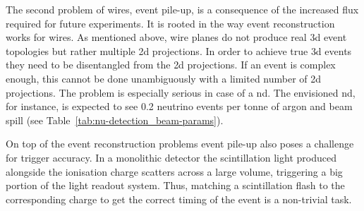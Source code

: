 The second problem of wires, event pile-up, is a consequence of the increased flux required for future experiments.
It is rooted in the way event reconstruction works for wires.
As mentioned above, wire planes do not produce real \gls{3d} event topologies but rather multiple \gls{2d} projections.
In order to achieve true \gls{3d} events they need to be disentangled from the \gls{2d} projections.
If an event is complex enough, this cannot be done unambiguously with a limited number of \gls{2d} projections.
The problem is especially serious in case of a \gls{nd}.
The envisioned \dune{} \gls{nd}, for instance, is expected to see \num{0.2} neutrino events per tonne of argon and beam spill (see Table~\ref{tab:nu-detection_beam-params}).

On top of the event reconstruction problems event pile-up also poses a challenge for trigger accuracy.
In a monolithic detector the scintillation light produced alongside the ionisation charge scatters across a large volume, triggering a big portion of the light readout system.
Thus, matching a scintillation flash to the corresponding charge to get the correct timing of the event is a non-trivial task.